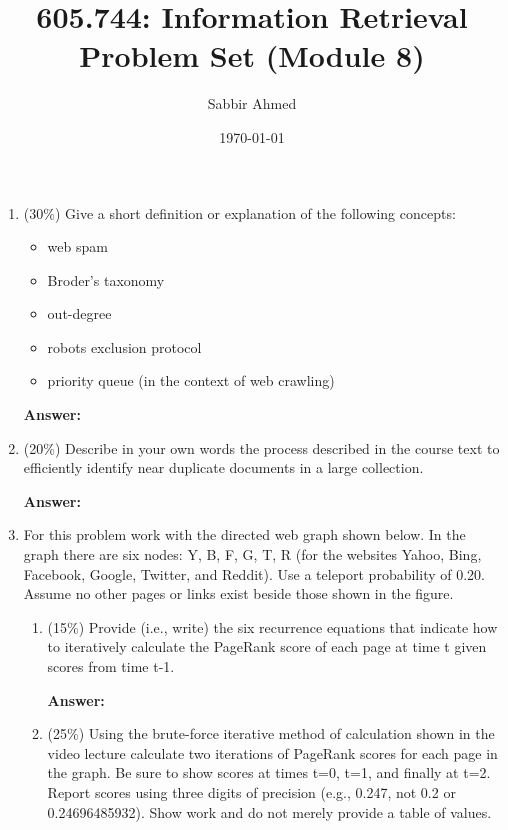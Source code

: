 \documentclass[11pt]{article}
\title{605.744: Information Retrieval \\ Problem Set (Module 8)}
\author{Sabbir Ahmed}
\date{\today}
\begin{document}
\maketitle

    \begin{enumerate}

        \item (30\%) Give a short definition or explanation of the following concepts:
        \begin{itemize}
            \item web spam
            \item Broder's taxonomy
            \item out-degree
            \item robots exclusion protocol
            \item priority queue (in the context of web crawling)
        \end{itemize}

        \textbf{Answer:}

        \item (20\%) Describe in your own words the process described in the course text to efficiently identify near duplicate documents in a large collection.

        \textbf{Answer:}

        \item For this problem work with the directed web graph shown below. In the graph there are six nodes: Y, B, F, G, T, R (for the websites Yahoo, Bing, Facebook, Google, Twitter, and Reddit). Use a teleport probability of 0.20. Assume no other pages or links exist beside those shown in the figure.


        \begin{enumerate}
            \item (15\%) Provide (i.e., write) the six recurrence equations that indicate how to iteratively calculate the PageRank score of each page at time t given scores from time t-1.
            
            \textbf{Answer:}

            \item (25\%) Using the brute-force iterative method of calculation shown in the video lecture calculate two iterations of PageRank scores for each page in the graph. Be sure to show scores at times t=0, t=1, and finally at t=2. Report scores using three digits of precision (e.g., 0.247, not 0.2 or 0.24696485932). Show work and do not merely provide a table of values.
            

\end{enumerate}
\end{enumerate}
\end{document}
